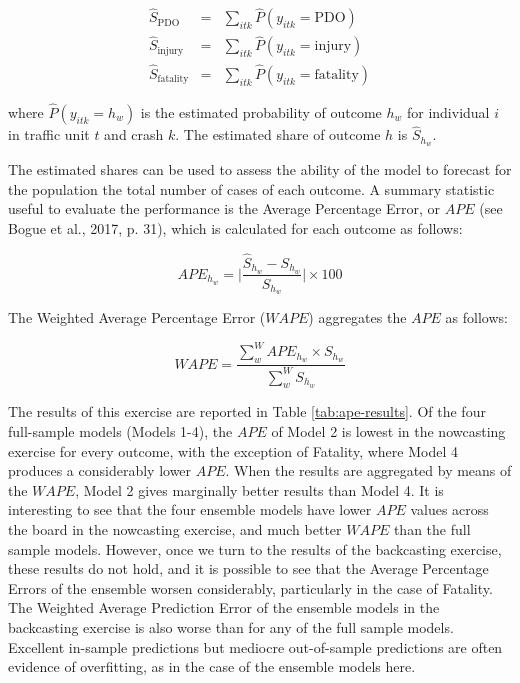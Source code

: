\documentclass[]{elsarticle} %
\begin{document}
\begin{equation}
\label{eq:predicted-shares}
\begin{array}{rcl}
\hat{S}_{\text{PDO}} &=& \sum_{itk}\hat{P}(y_{itk}=\text{PDO})\\
\hat{S}_{\text{injury}} &=& \sum_{itk}\hat{P}(y_{itk}=\text{injury})\\
\hat{S}_{\text{fatality}} &=& \sum_{itk}\hat{P}(y_{itk}=\text{fatality})
\end{array}
\end{equation}

\noindent where \(\hat{P}(y_{itk}=h_w)\) is the estimated probability of
outcome \(h_w\) for individual \(i\) in traffic unit \(t\) and crash
\(k\). The estimated share of outcome \(h\) is \(\hat{S}_{h_w}\).

The estimated shares can be used to assess the ability of the model to
forecast for the population the total number of cases of each outcome. A
summary statistic useful to evaluate the performance is the Average
Percentage Error, or \(APE\) (see Bogue et al., 2017, p. 31), which is
calculated for each outcome as follows:

\begin{equation}
\label{eq:APE}
APE_{h_w} = \Bigg|\frac{\hat{S}_{h_w} - S_{h_w}}{S_{h_w}}\Bigg|\times 100
\end{equation}

The Weighted Average Percentage Error (\(WAPE\)) aggregates the \(APE\)
as follows:

\begin{equation}
\label{eq:WAPE}
WAPE = \frac{\sum_w^WAPE_{h_w}\times S_{h_w}}{\sum_w^WS_{h_w}}
\end{equation}

The results of this exercise are reported in Table
\ref{tab:ape-results}. Of the four full-sample models (Models 1-4), the
\(APE\) of Model 2 is lowest in the nowcasting exercise for every
outcome, with the exception of Fatality, where Model 4 produces a
considerably lower \(APE\). When the results are aggregated by means of
the \(WAPE\), Model 2 gives marginally better results than Model 4. It
is interesting to see that the four ensemble models have lower \(APE\)
values across the board in the nowcasting exercise, and much better
\(WAPE\) than the full sample models. However, once we turn to the
results of the backcasting exercise, these results do not hold, and it
is possible to see that the Average Percentage Errors of the ensemble
worsen considerably, particularly in the case of Fatality. The Weighted
Average Prediction Error of the ensemble models in the backcasting
exercise is also worse than for any of the full sample models. Excellent
in-sample predictions but mediocre out-of-sample predictions are often
evidence of overfitting, as in the case of the ensemble models here.
\end{document}
